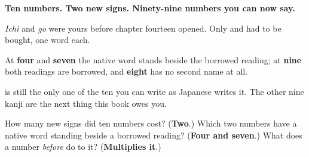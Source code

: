 \begin{grammarlens}[title={What you've built in two chapters, in three numbers}]
\textbf{Ten numbers. Two new signs. Ninety-nine numbers you can now say.}

\emph{Ichi} and \emph{go} were yours before chapter fourteen opened. Only \textbf{} and \textbf{} had to be bought, one word each.

At \textbf{four} and \textbf{seven} the native word stands beside the borrowed reading; at \textbf{nine} both readings are borrowed, and \textbf{eight} has no second name at all.

\textbf{} is still the only one of the ten you can write as Japanese writes it. The other nine kanji are the next thing this book owes you.
\end{grammarlens}

\begin{tcolorbox}[breakable,colback=teal!4,colframe=teal!35!black,title={Before you move on}]
How many new signs did ten numbers cost? (\textbf{Two}.) Which two numbers have a native word standing beside a borrowed reading? (\textbf{Four and seven}.) What does a number \emph{before} \textbf{} do to it? (\textbf{Multiplies it}.)
\end{tcolorbox}
